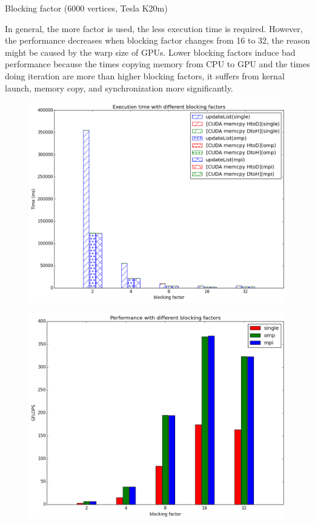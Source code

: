 \documentclass[12pt]{article}
\makeatletter
\renewenvironment{itemize}
{\list{$\bullet$}{\leftmargin\z@ \labelwidth\z@ \itemindent-\leftmargin
\let\makelabel\descriptionlabel}}
{\endlist}
\makeatother
\begin{document}
\begin{itemize}
\begin{figure}[ht]
        \vspace{-60pt}
    \end{figure}

    \newpage
    \item Blocking factor (6000 vertices, Tesla K20m)
    \begin{flushleft}
        In general, the more factor is used, the less execution time is required. However, the performance decreases when blocking factor changes from 16 to 32, the reason might be caused by the warp size of GPUs. Lower blocking factors induce bad performance because the times copying memory from CPU to GPU and the times doing iteration are more than higher blocking factors, it suffers from kernal launch, memory copy, and synchronization more significantly.
    \end{flushleft}
    \begin{figure}[ht]
        \includegraphics[scale=.5]{./blocking-factor-time.png}
    \end{figure}
    \begin{figure}[ht]
        \vspace{-20pt}
        \includegraphics[scale=.5]{./blocking-factor-perf.png}
        \vspace{-60pt}
    \end{figure}


\end{itemize}
\end{document}

